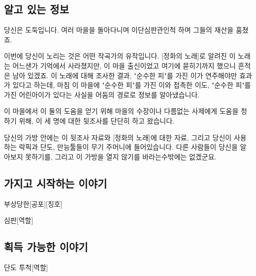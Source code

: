 \documentclass{report}
\begin{document}
	\subsection*{알고 있는 정보}
		당신은 도둑입니다. 여러 마을을 돌아다니며 이단심판관인척 하며 그들의 재산을 훔쳤죠.
		
		이번에 당신이 노리는 것은 어떤 작곡가의 유작입니다. [정화의 노래]로 알려진 이 노래는 어느샌가 기억에서 사라졌지만, 이 마을 출신이었고 여기에 묻히기까지 했으니 흔적은 남아 있겠죠. 이 노래에 대해 조사한 결과, "순수한 피"를 가진 이가 연주해야만 효과가 있다고 하는데, 마침 이 마을에 "순수한 피"를 가진 이와 접촉한 이도, "순수한 피"를 가진 어린아이가 있다는 사실을 어둠의 경로로 정보를 알아냈습니다.
		
		이 마을에서 이 둘의 도움을 얻기 위해 마을의 수장이나 다름없는 사제에게 도움을 청하기 위해, 이 세 명에 대한 뒷조사를 단단히 하고 왔습니다.
		
		당신의 가방 안에는 이 뒷조사 자료와 [정화의 노래]에 대한 자료, 그리고 당신이 사용하는 락픽과 단도, 만능툴들이 무기 주머니에 들어있습니다. 다른 사람들이 당신을 알아보지 못하기를, 그리고 이 가방을 열지 않기를 바라는수밖에는 없겠군요.
	
	\subsection*{가지고 시작하는 이야기}
		\begin{spoiler}{부상당한}{[공포][칭호]}
			
		\end{spoiler}
		
		\begin{spoiler}{심판}{[역할]}
		\end{spoiler}
	
	\subsection*{획득 가능한 이야기}
		\begin{spoiler}{단도 투척}{[역할]}
			
		\end{spoiler}
\end{document}

